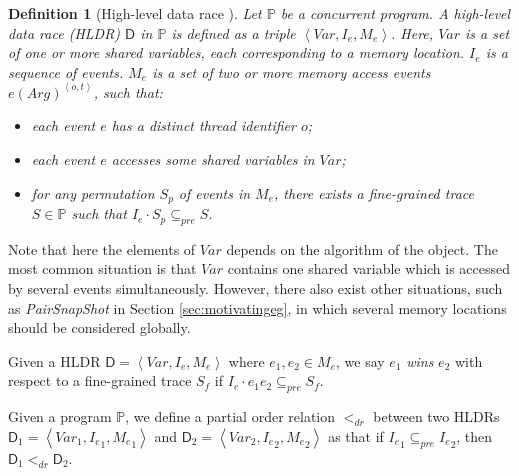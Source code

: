 \documentclass[runningheads]{llncs}
\newcommand{\p}{\mathbb{P} }
\newcommand{\se}{\mathit{I_e}}
\newcommand{\ce}{\mathit{M_e}}
\newtheorem{myDef}{Definition}
\begin{document}
\begin{myDef}[High-level data race \cite{DBLP:journals/stvr/ArthoHB03}]\label{def:datarace}
Let $\p$ be a concurrent program. 
A \textit{high-level data race} (\textit{HLDR}) $\mathsf{D}$ in $\mathbb{P}$ is defined as a triple $\left\langle \mathit{Var}, \se, \ce\right\rangle$. 
Here, $\mathit{Var}$ is a set of one or more shared variables, each corresponding to a memory location. $\se$ is a sequence of events.
$\ce$ is a set of two or more memory access events $e(\mathit{Arg})^{\left\langle o,t\right\rangle}$, such that:

\begin{itemize}
\item each event $e$ has a distinct thread identifier $o$;
\item each event $e$ accesses some shared variables in $\mathit{Var}$;
\item for any permutation $S_p$ of events in $\ce$, there exists a fine-grained trace $S\in \p$ such that $\se \cdot S_p \subseteq_{pre} S$.
\end{itemize}




\end{myDef}

Note that here the elements of $\mathit{Var}$ depends on the algorithm of the object. The most common situation is that 
$\mathit{Var}$ contains one shared variable which is accessed by 
several events 
simultaneously.
However, there also exist other situations, such as \textit{PairSnapShot} in Section \ref{sec:motivatingeg}, in which several memory locations should be considered globally.

Given a HLDR $\mathsf{D}  = \left\langle \mathit{Var}, \se, \ce\right\rangle$ where $e_1, e_2\in \ce$, we say $e_1$ \textit{wins} $e_2$ with respect to a fine-grained trace $S_f$ if 
 $\se\cdot e_1e_2 \subseteq_{pre} S_f $.
 
 Given a program $\mathbb{P}$, we define a partial order relation $<_{dr}$ between two HLDRs $\mathsf{D}_1=\left\langle \mathit{Var}_1, \se_1, \ce_1\right\rangle$ and $\mathsf{D}_2 = \left\langle \mathit{Var}_2, \se_2, \ce_2\right\rangle$ as that if $\se_1\subseteq_{pre}\se_2$, then $\mathsf{D}_1<_{dr}\mathsf{D}_2$. 
\end{document}
